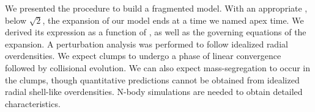 We presented the procedure to build a \HubLem fragmented model. With an appropriate \tHub, below $\sqrt{2}$, the expansion of our model ends at a time we named apex time. We derived its expression as a function of \tHub, as well as the governing equations of the expansion. A perturbation analysis was performed to follow idealized radial overdensities. We expect clumps to undergo a phase of linear convergence followed by collisional evolution. We can also expect mass-segregation to occur in the clumps, though quantitative predictions cannot be obtained from idealized radial shell-like overdensities. N-body simulations are needed to obtain detailed characteristics.















